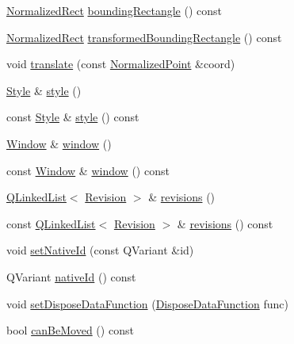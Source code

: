 \begin{DoxyCompactItemize}
\item 
\hyperlink{classOkular_1_1NormalizedRect}{Normalized\+Rect} \hyperlink{classOkular_1_1Annotation_a450fbd08aeb31262a33a628b4ab0dd42}{bounding\+Rectangle} () const 
\item 
\hyperlink{classOkular_1_1NormalizedRect}{Normalized\+Rect} \hyperlink{classOkular_1_1Annotation_a950ea9c7993878729eb4b6b0ea922436}{transformed\+Bounding\+Rectangle} () const 
\item 
void \hyperlink{classOkular_1_1Annotation_ae0ef33b85b6049645b7a94fd97984d52}{translate} (const \hyperlink{classOkular_1_1NormalizedPoint}{Normalized\+Point} \&coord)
\item 
\hyperlink{classOkular_1_1Annotation_1_1Style}{Style} \& \hyperlink{classOkular_1_1Annotation_ae1f845ddbd6d524b2b388c6c9ef26423}{style} ()
\item 
const \hyperlink{classOkular_1_1Annotation_1_1Style}{Style} \& \hyperlink{classOkular_1_1Annotation_ab753347d676ebf1da5371bc40cf6dcb8}{style} () const 
\item 
\hyperlink{classOkular_1_1Annotation_1_1Window}{Window} \& \hyperlink{classOkular_1_1Annotation_a560281f35ace621f48181a7c7977ca7f}{window} ()
\item 
const \hyperlink{classOkular_1_1Annotation_1_1Window}{Window} \& \hyperlink{classOkular_1_1Annotation_af96fe7c314bc49e869d5e28b8efa928b}{window} () const 
\item 
\hyperlink{classQLinkedList}{Q\+Linked\+List}$<$ \hyperlink{classOkular_1_1Annotation_1_1Revision}{Revision} $>$ \& \hyperlink{classOkular_1_1Annotation_a3d157b31fb9d228999cf1042fc523251}{revisions} ()
\item 
const \hyperlink{classQLinkedList}{Q\+Linked\+List}$<$ \hyperlink{classOkular_1_1Annotation_1_1Revision}{Revision} $>$ \& \hyperlink{classOkular_1_1Annotation_a96c59d107de84f13b38784a7c419bd60}{revisions} () const 
\item 
void \hyperlink{classOkular_1_1Annotation_a77c8188ca0d81966c29aebe0ef7ccfef}{set\+Native\+Id} (const Q\+Variant \&id)
\item 
Q\+Variant \hyperlink{classOkular_1_1Annotation_a1551f5ed393ffe61c30087cf2c78dac6}{native\+Id} () const 
\item 
void \hyperlink{classOkular_1_1Annotation_a83d33746416b0a8fc528da35db3e9849}{set\+Dispose\+Data\+Function} (\hyperlink{classOkular_1_1Annotation_a4f2759100645cdce807944767937dd18}{Dispose\+Data\+Function} func)
\item 
bool \hyperlink{classOkular_1_1Annotation_aebeab4bec3d43cdb6498c6b9d9b59adf}{can\+Be\+Moved} () const 

\end{DoxyCompactItemize}
